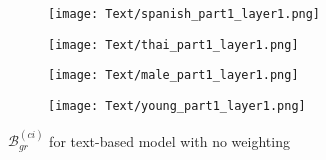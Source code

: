 \begin{figure}[H]
    \centering
    \begin{minipage}{0.23\textwidth}
        \begin{figure}[H]
            \centering
            \texttt{[image: Text/spanish\_part1\_layer1.png]}
        \end{figure}
    \end{minipage}
    \begin{minipage}{0.23\textwidth}
        \begin{figure}[H]
            \centering
            \texttt{[image: Text/thai\_part1\_layer1.png]}
        \end{figure}
    \end{minipage}
    \begin{minipage}{0.23\textwidth}
        \begin{figure}[H]
            \centering
            \texttt{[image: Text/male\_part1\_layer1.png]}
        \end{figure}
    \end{minipage}
    \begin{minipage}{0.23\textwidth}
        \begin{figure}[H]
            \centering
            \texttt{[image: Text/young\_part1\_layer1.png]}
        \end{figure}
    \end{minipage}
    \caption{$\mathcal{B}_{gr}^{(ci)}$ for text-based model with no weighting}
    \label{fig:grad_text}
\end{figure}

